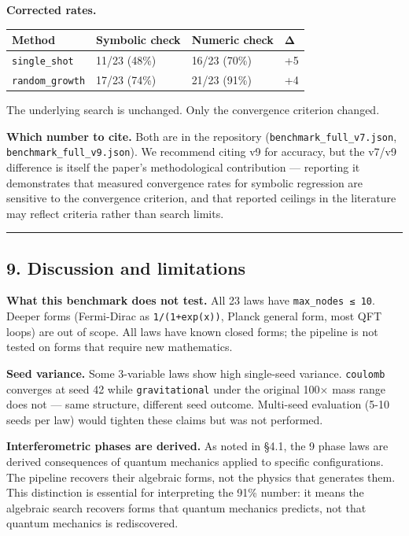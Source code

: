 \documentclass[
]{article}
\newcounter{none} %
\begin{document}
\textbf{Corrected rates.}

{\def\LTcaptype{none} %
\begin{longtable}[]{@{}llll@{}}
\toprule\noalign{}
Method & Symbolic check & Numeric check & Δ \\
\midrule\noalign{}
\endhead
\bottomrule\noalign{}
\endlastfoot
\texttt{single\_shot} & 11/23 (48\%) & 16/23 (70\%) & +5 \\
\texttt{random\_growth} & 17/23 (74\%) & 21/23 (91\%) & +4 \\
\end{longtable}
}

The underlying search is unchanged. Only the convergence criterion
changed.

\textbf{Which number to cite.} Both are in the repository
(\texttt{benchmark\_full\_v7.json}, \texttt{benchmark\_full\_v9.json}).
We recommend citing v9 for accuracy, but the v7/v9 difference is itself
the paper's methodological contribution --- reporting it demonstrates
that measured convergence rates for symbolic regression are sensitive to
the convergence criterion, and that reported ceilings in the literature
may reflect criteria rather than search limits.

\begin{center}\rule{0.5\linewidth}{0.5pt}\end{center}

\subsection{9. Discussion and
limitations}\label{discussion-and-limitations}

\textbf{What this benchmark does not test.} All 23 laws have
\texttt{max\_nodes\ ≤\ 10}. Deeper forms (Fermi-Dirac as
\texttt{1/(1+exp(x))}, Planck general form, most QFT loops) are out of
scope. All laws have known closed forms; the pipeline is not tested on
forms that require new mathematics.

\textbf{Seed variance.} Some 3-variable laws show high single-seed
variance. \texttt{coulomb} converges at seed 42 while
\texttt{gravitational} under the original 100× mass range does not ---
same structure, different seed outcome. Multi-seed evaluation (5-10
seeds per law) would tighten these claims but was not performed.

\textbf{Interferometric phases are derived.} As noted in §4.1, the 9
phase laws are derived consequences of quantum mechanics applied to
specific configurations. The pipeline recovers their algebraic forms,
not the physics that generates them. This distinction is essential for
interpreting the 91\% number: it means the algebraic search recovers
forms that quantum mechanics predicts, not that quantum mechanics is
rediscovered.
\end{document}
